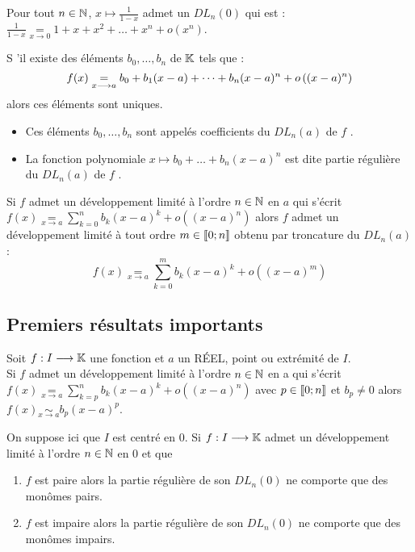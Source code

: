 \begin{defprop}
    Pour tout \(n \in  \mathbb{N}\), \(x \mapsto  \frac{1}{1 - x}\) admet un \(DL_n(0)\) qui est : \(\frac{1}{1 - x} \underset{x \to 0}{=} 1 + x + x^2 + \dots + x^n + o(x^n)\).
\end{defprop}

\begin{defprop}
   S ’il existe des éléments \(b_0, \dots, b_n\) de \(\mathbb{K}\) tels que :
   \[f (x) \underset{x \longrightarrow a}{=} b_0 + b_1(x - a) + \dots + b_n(x - a)^n + o \left((x - a)^n\right)\]
   alors ces éléments sont uniques.
   \begin{itemize}
        \item Ces éléments \(b_0, \dots, b_n\) sont appelés coefficients du \(DL_n(a)\) de \(f\) .
        \item La fonction polynomiale \(x \mapsto  b_0 + \dots + b_n(x - a)^n\) est dite partie régulière du \(DL_n(a)\) de \(f\) .
   \end{itemize}
\end{defprop}

\begin{defprop}
    Si \(f\) admet un développement limité à l’ordre \(n \in  \mathbb{N}\) en \(a\) qui s’écrit \(f (x) \underset{x\to a}{=} \sum^n_{k=0} b_k(x - a)^k +o ((x - a)^n)\)
    alors \(f\) admet un développement limité à tout ordre \(m \in  \left\llbracket0;n\right\rrbracket\) obtenu par troncature du \(DL_n(a)\) :
    \[f (x) \underset{x\to a}{=} \sum^m_{ k=0} b_k(x - a)^k + o ((x - a)^m)\] 
\end{defprop}

\subsection{Premiers résultats importants}
\begin{defprop}
    Soit \(f : I \longrightarrow  \mathbb{K}\) une fonction et \(a\) un RÉEL, point ou extrémité de \(I\).\\
    Si \(f\) admet un développement limité à l’ordre \(n \in  \mathbb{N}\) en a qui s’écrit \(f (x) \underset{x\to a}{=}\sum^n_{k=p} b_k(x - a)^k +o ((x - a)^n)\) avec \(p \in  \left\llbracket0;n\right\rrbracket \) et \(b_p\neq 0\) alors \(f (x) \underset{x \to a}{\sim} b_p(x - a)^p\).
\end{defprop}

\begin{defprop}
    On suppose ici que \(I\) est centré en \(0\).
Si \(f : I \longrightarrow  \mathbb{K}\) admet un développement limité à l’ordre \(n \in  \mathbb{N}\) en \(0\) et que
    \begin{enumerate}
        \item \(f\) est paire alors la partie régulière de son \(DL_n(0)\) ne comporte que des monômes pairs.
        \item \(f\) est impaire alors la partie régulière de son \( DL_n(0)\) ne comporte que des monômes impairs.
    \end{enumerate}

\end{defprop}

